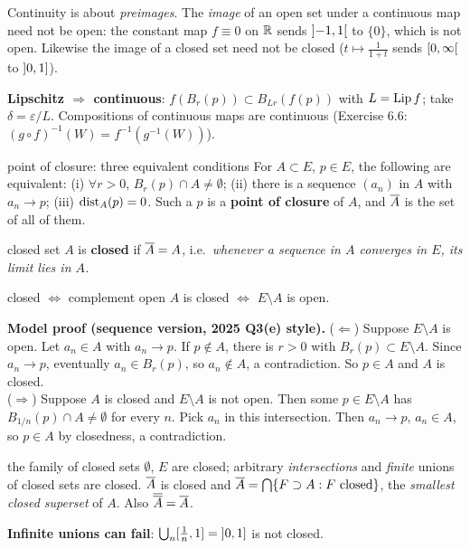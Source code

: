\begin{tip}
Continuity is about \emph{preimages}. The \emph{image} of an open set under a continuous map
need not be open: the constant map $f\equiv0$ on $\mathbb R$ sends $\mathopen{]}-1,1\mathclose{[}$ to $\{0\}$, which is not
open. Likewise the image of a closed set need not be closed ($t\mapsto\frac1{1+t}$ sends
$\mathopen{[}0,\infty\mathclose{[}$ to $\mathopen{]}0,1\mathclose{]}$).
\end{tip}

\textbf{Lipschitz $\Rightarrow$ continuous}: $f(B_r(p))\subset B_{Lr}(f(p))$ with $L=\operatorname{Lip} f$;
take $\delta=\varepsilon/L$. Compositions of continuous maps are continuous (Exercise 6.6:
$(g\circ f)^{-1}(W)=f^{-1}(g^{-1}(W))$).

\begin{thm}{point of closure: three equivalent conditions}
For $A\subset E$, $p\in E$, the following are equivalent:
(i) $\forall r>0$, $B_r(p)\cap A\ne\emptyset$; (ii) there is a sequence $(a_n)$ in $A$ with
$a_n\to p$; (iii) $\operatorname{dist}_A(p)=0$. Such a $p$ is a \textbf{point of closure} of $A$, and $\overline{A}$
is the set of all of them.
\end{thm}
\begin{defn}{closed set}
$A$ is \textbf{closed} if $\overline{A}=A$, i.e.\ \emph{whenever a sequence in $A$ converges in $E$,
its limit lies in $A$.}
\end{defn}

\begin{thm}{closed $\iff$ complement open}
$A$ is closed $\iff$ $E\setminus A$ is open.
\end{thm}
\begin{answer}
\textbf{Model proof (sequence version, 2025 Q3(e) style).}
($\Leftarrow$) Suppose $E\setminus A$ is open. Let $a_n\in A$ with $a_n\to p$. If $p\notin A$,
there is $r>0$ with $B_r(p)\subset E\setminus A$. Since $a_n\to p$, eventually $a_n\in B_r(p)$,
so $a_n\notin A$, a contradiction. So $p\in A$ and $A$ is closed.\\
($\Rightarrow$) Suppose $A$ is closed and $E\setminus A$ is not open. Then some
$p\in E\setminus A$ has $B_{1/n}(p)\cap A\ne\emptyset$ for every $n$. Pick $a_n$ in this
intersection. Then $a_n\to p$, $a_n\in A$, so $p\in A$ by closedness, a contradiction.
\end{answer}

\begin{thm}{the family of closed sets}
$\emptyset$, $E$ are closed; arbitrary \emph{intersections} and \emph{finite} unions of closed
sets are closed. $\overline{A}$ is closed and $\overline{A}=\bigcap\{F\supset A: F\text{ closed}\}$, the
\emph{smallest closed superset} of $A$. Also $\overline{\overline{A}}=\overline{A}$.
\end{thm}
\textbf{Infinite unions can fail}: $\bigcup_n[\frac1n,1]=\mathopen{]}0,1\mathclose{]}$ is not closed.

